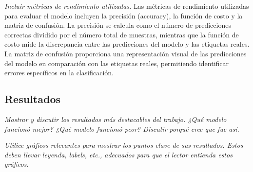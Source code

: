 \documentclass[11pt]{article}
\begin{document}
\textit{Incluir métricas de rendimiento utilizadas.}
Las métricas de rendimiento utilizadas para evaluar el modelo incluyen la precisión (accuracy), la función de costo y la matriz de confusión. La precisión se calcula como el número de predicciones correctas dividido por el número total de muestras, mientras que la función de costo mide la discrepancia entre las predicciones del modelo y las etiquetas reales. La matriz de confusión proporciona una representación visual de las predicciones del modelo en comparación con las etiquetas reales, permitiendo identificar errores específicos en la clasificación.

\subsection{Resultados}
\textit{Mostrar y discutir los resultados más destacables del trabajo. ¿Qué modelo funcionó mejor? ¿Qué modelo funcionó peor? Discutir porqué cree que fue así.}

\textit{Utilice gráficos relevantes para mostrar los puntos clave de sus resultados. Estos deben llevar leyenda, labels, etc., adecuados para que el lector entienda estos gráficos.}
\end{document}
